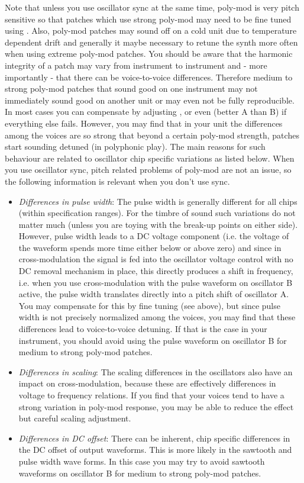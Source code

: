 Note that unless you use oscillator sync at the same time, poly-mod is very pitch sensitive so that patches which use strong poly-mod may need to be fine tuned using \freqfine. Also, poly-mod patches may sound off on a cold unit due to temperature dependent drift and generally it maybe necessary to retune the synth more often when using extreme poly-mod patches. You should be aware that the harmonic integrity of a patch may vary from instrument to instrument and - more importantly - that there can be voice-to-voice differences. Therefore medium to strong poly-mod patches that sound good on one instrument may not immediately sound good on another unit or may even not be fully reproducible. In most cases you can compensate by adjusting \freqfine, \polymodosc or even \oscfreq (better A than B) if everything else fails. However, you may find that in your unit the differences among the voices are so strong that beyond a certain poly-mod strength, patches start sounding detuned (in polyphonic play). The main reasons for such behaviour are related to oscillator chip specific variations as listed below. When you use oscillator sync, pitch related problems of poly-mod are not an issue, so the following information is relevant when you don't use sync.

\begin{itemize}
  \item \textit{Differences in pulse width}: The pulse width is generally different for all chips (within specification ranges). For the timbre of sound such variations do not matter much (unless you are toying with the break-up points on either side). However, pulse width leads to a DC voltage component (i.e. the voltage of the waveform spends more time either below or above zero) and since in cross-modulation the signal is fed into the oscillator voltage control with no DC removal mechanism in place, this directly produces a shift in frequency, i.e. when you use cross-modulation with the pulse waveform on oscillator B active, the pulse width translates directly into a pitch shift of oscillator A. You may compensate for this by fine tuning (see above), but since pulse width is not precisely normalized among the voices, you may find that these differences lead to voice-to-voice detuning. If that is the case in your instrument, you should avoid using the pulse waveform on oscillator B for medium to strong poly-mod patches.      
  \item \textit{Differences in scaling}: The scaling differences in the oscillators also have an impact on cross-modulation, because these are effectively differences in voltage to frequency relations. If you find that your voices tend to have a strong variation in poly-mod response, you may be able to reduce the effect but careful scaling adjustment.
  \item \textit{Differences in DC offset}: There can be inherent, chip specific differences in the DC offset of output waveforms. This is more likely in the sawtooth and pulse width wave forms. In this case you may try to avoid sawtooth waveforms on oscillator B for medium to strong poly-mod patches.
\end{itemize}

